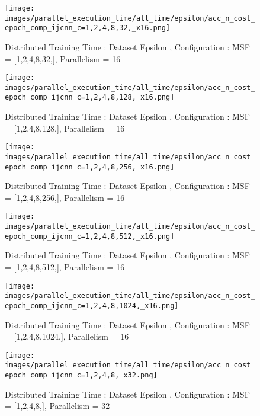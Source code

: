 \begin{figure*}[htbp]
\centering
\texttt{[image: images/parallel\_execution\_time/all\_time/epsilon/acc\_n\_cost\_epoch\_comp\_ijcnn\_c=1,2,4,8,32,\_x16.png]}
\caption{Distributed Training Time : Dataset Epsilon , Configuration : MSF = [1,2,4,8,32,], Parallelism = 16}
\label{fig:dis-msf-tr-time-epsilon-x16}
\end{figure*}


\begin{figure*}[htbp]
\centering
\texttt{[image: images/parallel\_execution\_time/all\_time/epsilon/acc\_n\_cost\_epoch\_comp\_ijcnn\_c=1,2,4,8,128,\_x16.png]}
\caption{Distributed Training Time : Dataset Epsilon , Configuration : MSF = [1,2,4,8,128,], Parallelism = 16}
\label{fig:dis-msf-tr-time-epsilon-x16}
\end{figure*}


\begin{figure*}[htbp]
\centering
\texttt{[image: images/parallel\_execution\_time/all\_time/epsilon/acc\_n\_cost\_epoch\_comp\_ijcnn\_c=1,2,4,8,256,\_x16.png]}
\caption{Distributed Training Time : Dataset Epsilon , Configuration : MSF = [1,2,4,8,256,], Parallelism = 16}
\label{fig:dis-msf-tr-time-epsilon-x16}
\end{figure*}


\begin{figure*}[htbp]
\centering
\texttt{[image: images/parallel\_execution\_time/all\_time/epsilon/acc\_n\_cost\_epoch\_comp\_ijcnn\_c=1,2,4,8,512,\_x16.png]}
\caption{Distributed Training Time : Dataset Epsilon , Configuration : MSF = [1,2,4,8,512,], Parallelism = 16}
\label{fig:dis-msf-tr-time-epsilon-x16}
\end{figure*}


\begin{figure*}[htbp]
\centering
\texttt{[image: images/parallel\_execution\_time/all\_time/epsilon/acc\_n\_cost\_epoch\_comp\_ijcnn\_c=1,2,4,8,1024,\_x16.png]}
\caption{Distributed Training Time : Dataset Epsilon , Configuration : MSF = [1,2,4,8,1024,], Parallelism = 16}
\label{fig:dis-msf-tr-time-epsilon-x16}
\end{figure*}


\begin{figure*}[htbp]
\centering
\texttt{[image: images/parallel\_execution\_time/all\_time/epsilon/acc\_n\_cost\_epoch\_comp\_ijcnn\_c=1,2,4,8,\_x32.png]}
\caption{Distributed Training Time : Dataset Epsilon , Configuration : MSF = [1,2,4,8,], Parallelism = 32}
\label{fig:dis-msf-tr-time-epsilon-x32}
\end{figure*}


